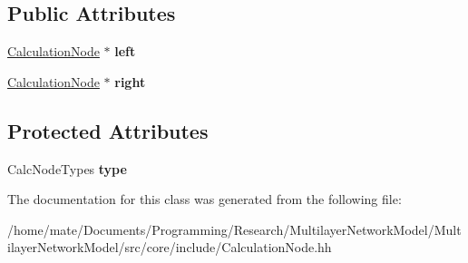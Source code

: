 \subsection*{Public Attributes}
\begin{DoxyCompactItemize}
\item 
\hyperlink{classCalculationNode}{Calculation\+Node} $\ast$ {\bfseries left}\hypertarget{classCalculationNode_ae82c63d4efc74c0b11a00cc06f225629}{}\label{classCalculationNode_ae82c63d4efc74c0b11a00cc06f225629}

\item 
\hyperlink{classCalculationNode}{Calculation\+Node} $\ast$ {\bfseries right}\hypertarget{classCalculationNode_a55560a0b8fa37b8443c908a06d08f087}{}\label{classCalculationNode_a55560a0b8fa37b8443c908a06d08f087}

\end{DoxyCompactItemize}
\subsection*{Protected Attributes}
\begin{DoxyCompactItemize}
\item 
Calc\+Node\+Types {\bfseries type}\hypertarget{classCalculationNode_a9380df8305abde9a1e3a6a3f5fd6dea0}{}\label{classCalculationNode_a9380df8305abde9a1e3a6a3f5fd6dea0}

\end{DoxyCompactItemize}


The documentation for this class was generated from the following file\+:\begin{DoxyCompactItemize}
\item 
/home/mate/\+Documents/\+Programming/\+Research/\+Multilayer\+Network\+Model/\+Multilayer\+Network\+Model/src/core/include/Calculation\+Node.\+hh\end{DoxyCompactItemize}
